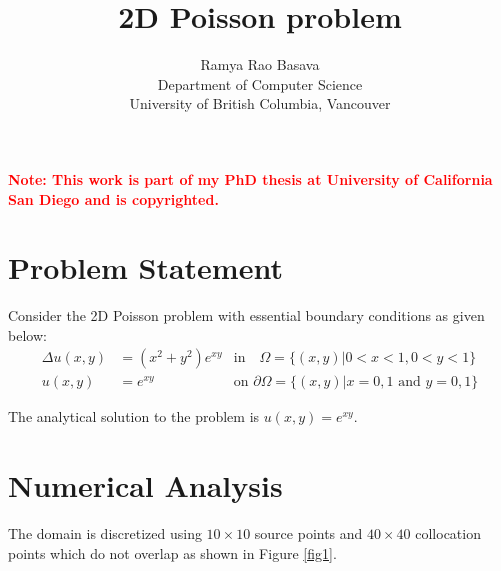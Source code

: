\documentclass[11pt, letterpaper]{article}
\title{\textbf{2D Poisson problem}}
\author{Ramya Rao Basava\\
Department of Computer Science\\
University of British Columbia, Vancouver}
\date{}
\begin{document}
\maketitle

\noindent \textcolor{red}{\textbf{Note: This work is part of my PhD thesis at University of California San Diego and is copyrighted.}}

\section{Problem Statement}
Consider the 2D Poisson problem with essential boundary conditions as given
below:
\begin{align*}
\Delta u (x,y) &= (x^2+y^2)e^{xy} &\text{in} \quad \Omega = \{(x,y) \vert 0 < x < 1,0 < y < 1\} \\
u (x,y) &= e^{xy} \quad &\text{on }  \partial\Omega = \{(x,y) \vert x=0,1 \text{ and } y=0,1\}
\end{align*}

The analytical solution to the problem is $u (x,y) = e^{xy}$.

\section{Numerical Analysis}

The domain is discretized using $10\times10$ source points and  $40\times40$ collocation points which do not overlap as shown in Figure \ref{fig1}. 
\end{document}

